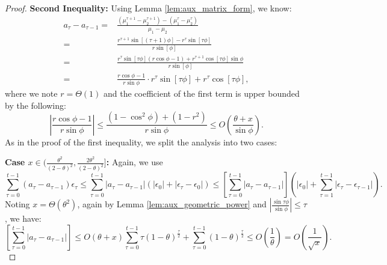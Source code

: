 \begin{proof}
\noindent\textbf{Second Inequality:} 
Using Lemma \ref{lem:aux_matrix_form}, we know:
\begin{align*}
a_\tau - a_{\tau-1} 
=&  \frac{(\mu_1^{\tau+1} -  \mu_2^{\tau+1}) - (\mu_1^{\tau} -  \mu_2^{\tau}) }{\mu_1 -\mu_2} \\
=& \frac{r^{\tau+1}\sin[(\tau+1)\phi]
- r^{\tau}\sin[\tau\phi]}{r\sin[\phi]} \\
=& \frac{r^{\tau}\sin[\tau\phi](r\cos\phi - 1)
+ r^{\tau+1}\cos[\tau\phi]\sin\phi}{r\sin[\phi]} \\
=& \frac{r\cos\phi - 1}{r\sin\phi} \cdot r^{\tau}\sin[\tau\phi]  + r^{\tau}\cos[\tau\phi],
\end{align*}
where we note $r = \Theta(1)$ and the coefficient of the first 
term is upper bounded by the following:
\begin{equation*}
\left|\frac{r\cos\phi - 1}{r\sin\phi}\right|
\le \frac{(1-\cos^2\phi) + (1-r^2)}{r\sin\phi}
\le O\left(\frac{\theta + x}{\sin\phi}\right).
\end{equation*}
As in the proof of the first inequality, we split the analysis 
into two cases:

\noindent \textbf{Case $x \in (\frac{\theta^2}{(2-\theta)^2}, \frac{2\theta^2}{(2-\theta)^2}]$:} Again, we use
\begin{equation*}
\sum_{\tau = 0}^{t-1} (a_\tau - a_{\tau-1} )   \epsilon_\tau
\le \sum_{\tau = 0}^{t-1} |a_\tau- a_{\tau-1} |  (|\epsilon_0| + |\epsilon_\tau - \epsilon_0|)
\le \left[\sum_{\tau = 0}^{t-1} |a_\tau- a_{\tau-1} |\right]  \left(|\epsilon_0| + \sum_{\tau = 1}^{t-1}|\epsilon_\tau - \epsilon_{\tau -1}|\right).
\end{equation*}
Noting $x = \Theta(\theta^2)$, again by Lemma \ref{lem:aux_geometric_power} and $|\frac{\sin \tau\phi}{\sin \phi}| \le \tau$, we have:
\begin{equation*}
\left[\sum_{\tau = 0}^{t-1} |a_\tau- a_{\tau-1} |\right]
\le O(\theta + x)\sum_{\tau = 0}^{t-1}\tau (1-\theta)^{\frac{\tau}{2}} + \sum_{\tau = 0}^{t-1} (1-\theta)^{\frac{\tau}{2}}
\le O(\frac{1}{\theta}) = O(\frac{1}{\sqrt{x}}).
\end{equation*}


\end{proof}
